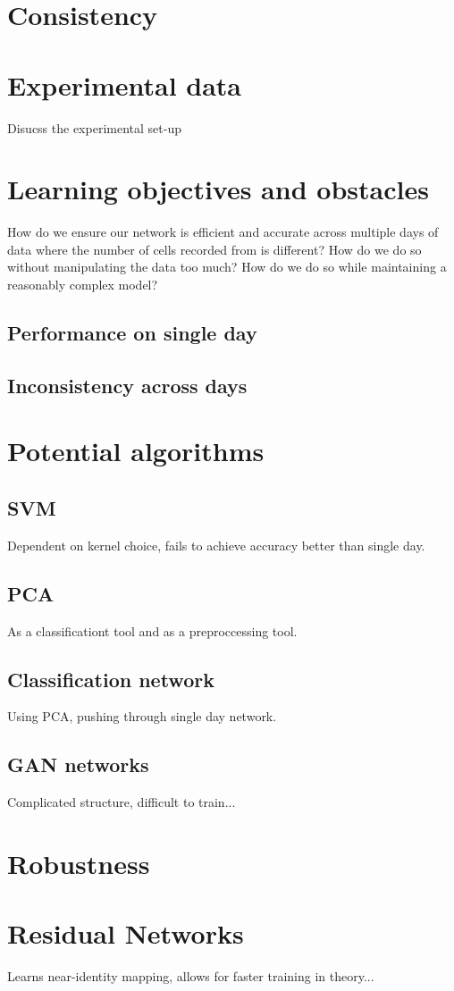 \documentclass[12pt]{article}
\begin{document}
\section*{Consistency}
\section{Experimental data}
Disucss the experimental set-up
\section{Learning objectives and obstacles}
How do we ensure our network is efficient and accurate across multiple days of data where the number of cells recorded from is different? How do we do so without manipulating the data too much? How do we do so while maintaining a reasonably complex model?
\subsection{Performance on single day}
\subsection{Inconsistency across days}
\section{Potential algorithms}
\subsection{SVM}
Dependent on kernel choice, fails to achieve accuracy better than single day.
\subsection{PCA}
As a classificationt tool and as a preproccessing tool.
\subsection{Classification network}
Using PCA, pushing through single day network.
\subsection{GAN networks}
Complicated structure, difficult to train...
\section*{Robustness}
\section{Residual Networks}
Learns near-identity mapping, allows for faster training in theory...
\end{document}
